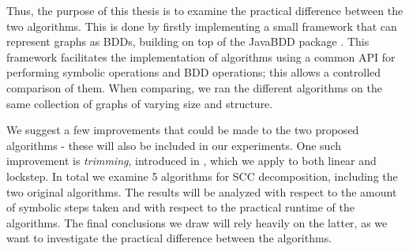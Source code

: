 \documentclass[../master/master.tex]{subfiles}
\begin{document}
Thus, the purpose of this thesis is to examine the practical difference between the two algorithms. This is done by firstly implementing a small framework that can represent graphs as BDDs, building on top of the JavaBDD package \cite{whaley}. This framework facilitates the implementation of algorithms using a common API for performing symbolic operations and BDD operations; this allows a controlled comparison of them. 
When comparing, we ran the different algorithms on the same collection of graphs of varying size and structure.

We suggest a few improvements that could be made to the two proposed algorithms - these will also be included in our experiments. One such improvement is \textit{trimming}, introduced in \cite{lockstep}, which we apply to both linear and lockstep. In total we examine 5 algorithms for SCC decomposition, including the two original algorithms. The results will be analyzed with respect to the amount of symbolic steps taken and with respect to the practical runtime of the algorithms. The final conclusions we draw will rely heavily on the latter, as we want to investigate the practical difference between the algorithms.
\end{document}

